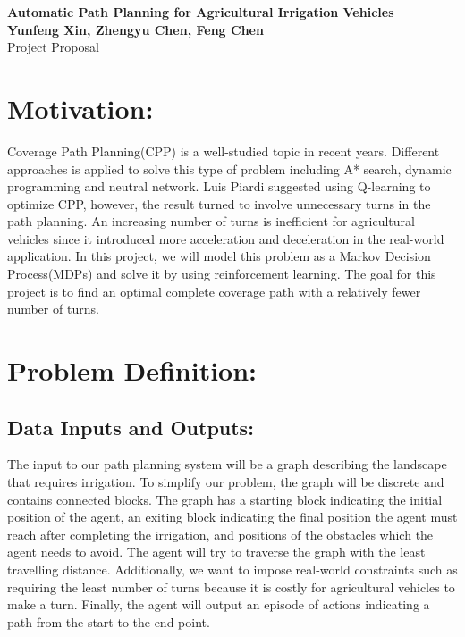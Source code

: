 \documentclass{article}
\begin{document}
	\begin{center}
    
		\LARGE{\textbf{Automatic Path Planning for Agricultural Irrigation Vehicles}} \\
        \vspace{1em}
        \normalsize\textbf{Yunfeng Xin, Zhengyu Chen, Feng Chen} \\
        \vspace{1em}
        \large{Project Proposal} \\
        \vspace{1em}
     
	\end{center}
    \begin{normalsize}
    
    	\section{Motivation:}
        
            Coverage Path Planning(CPP) is a well-studied topic in recent years. Different approaches is applied to solve this type of problem including A* search\cite{b1}, dynamic programming \cite{b2}and neutral network\cite{b3}. Luis Piardi\cite{b4} suggested using Q-learning to optimize CPP, however, the result turned to involve unnecessary turns in the path planning. An increasing number of turns is inefficient for agricultural vehicles since it introduced more acceleration and deceleration in the real-world application. In this project, we will model this problem as a Markov Decision Process(MDPs) and solve it by using reinforcement learning. The goal for this project is to find an optimal complete coverage path with a relatively fewer number of turns. 
      
		\section{Problem Definition:}
		
		    \subsection{Data Inputs and Outputs:}
		    
		        The input to our path planning system will be a graph describing the landscape that requires irrigation. To simplify our problem, the graph will be discrete and contains connected blocks. The graph has a starting block indicating the initial position of the agent, an exiting block indicating the final position the agent must reach after completing the irrigation, and positions of the obstacles which the agent needs to avoid. The agent will try to traverse the graph with the least travelling distance. Additionally, we want to impose real-world constraints such as requiring the least number of turns because it is costly for agricultural vehicles to make a turn. Finally, the agent will output an episode of actions indicating a path from the start to the end point.
		        

\end{normalsize}
\end{document}
